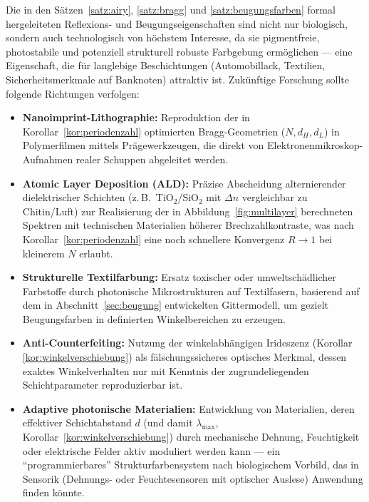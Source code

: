 ﻿\documentclass[a4paper,12pt]{article}
\theoremstyle{definition}
\begin{document}
	Die in den Sätzen~\ref{satz:airy}, \ref{satz:bragg} und
	\ref{satz:beugungsfarben} formal hergeleiteten Reflexions- und
	Beugungseigenschaften sind nicht nur biologisch, sondern auch
	technologisch von höchstem Interesse, da sie pigmentfreie,
	photostabile und potenziell strukturell robuste Farbgebung
	ermöglichen --- eine Eigenschaft, die für langlebige Beschichtungen
	(Automobillack, Textilien, Sicherheitsmerkmale auf Banknoten) attraktiv
	ist. Zukünftige Forschung sollte folgende Richtungen verfolgen:
	\begin{itemize}
		\item \textbf{Nanoimprint-Lithographie:} Reproduktion der in
		Korollar~\ref{kor:periodenzahl} optimierten Bragg-Geometrien
		($N,d_H,d_L$) in Polymerfilmen mittels Prägewerkzeugen, die direkt
		von Elektronenmikroskop-Aufnahmen realer Schuppen abgeleitet
		werden.
		\item \textbf{Atomic Layer Deposition (ALD):} Präzise Abscheidung
		alternierender dielektrischer Schichten (z.\,B.\
		TiO$_2$/SiO$_2$ mit $\Delta n$ vergleichbar zu Chitin/Luft) zur
		Realisierung der in Abbildung~\ref{fig:multilayer} berechneten
		Spektren mit technischen Materialien höherer Brechzahlkontraste,
		was nach Korollar~\ref{kor:periodenzahl} eine noch schnellere
		Konvergenz $R\to1$ bei kleinerem $N$ erlaubt.
		\item \textbf{Strukturelle Textilfarbung:} Ersatz toxischer oder
		umweltschädlicher Farbstoffe durch photonische Mikrostrukturen auf
		Textilfasern, basierend auf dem in
		Abschnitt~\ref{sec:beugung} entwickelten Gittermodell, um
		gezielt Beugungsfarben in definierten Winkelbereichen zu erzeugen.
		\item \textbf{Anti-Counterfeiting:} Nutzung der
		winkelabhängigen Irideszenz (Korollar
		\ref{kor:winkelverschiebung}) als fälschungssicheres optisches
		Merkmal, dessen exaktes Winkelverhalten nur mit Kenntnis der
		zugrundeliegenden Schichtparameter reproduzierbar ist.
		\item \textbf{Adaptive photonische Materialien:} Entwicklung von
		Materialien, deren effektiver Schichtabstand $d$ (und damit
		$\lambda_{\max}$, Korollar~\ref{kor:winkelverschiebung}) durch
		mechanische Dehnung, Feuchtigkeit oder elektrische Felder aktiv
		moduliert werden kann --- ein ``programmierbares'' Strukturfarben\-system
		nach biologischem Vorbild, das in Sensorik (Dehnungs- oder
		Feuchtesensoren mit optischer Auslese) Anwendung finden könnte.
	\end{itemize}
\end{document}
